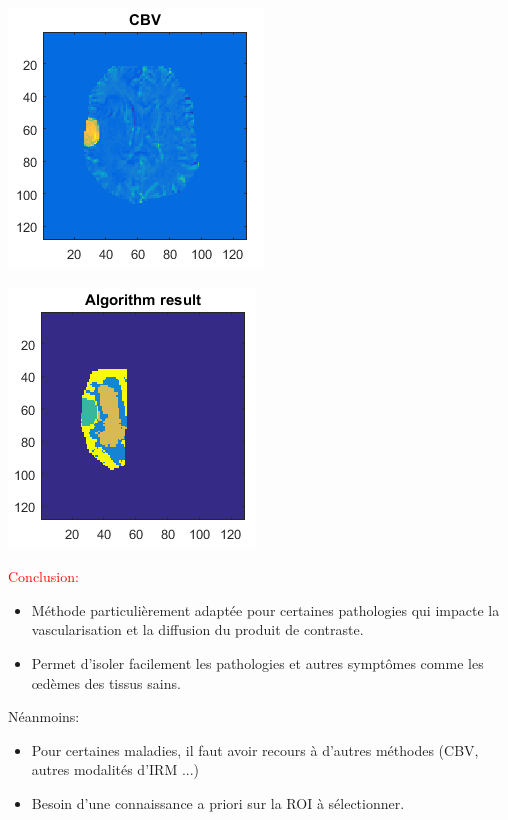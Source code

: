 \documentclass{beamer}
\begin{document}
\begin{frame}
\centering

\includegraphics[scale=0.8]{Patient4Result-CBV.png}

\end{frame}

\begin{frame}
\centering

\includegraphics[scale=0.8]{Patient4Result-ALGO.png}

\end{frame}


\begin{frame}

\textcolor{red}{Conclusion:}

\begin{itemize}
\item Méthode particulièrement adaptée pour certaines pathologies qui impacte la vascularisation et la diffusion du produit de contraste.
\item Permet d'isoler facilement les pathologies et autres symptômes comme les œdèmes des tissus sains.
\end{itemize}

Néanmoins:

\begin{itemize}
\item Pour certaines maladies, il faut avoir recours à d'autres méthodes (CBV, autres modalités d'IRM ...)
\item Besoin d'une connaissance a priori sur la ROI à sélectionner.
\end{itemize}


\end{frame}
\end{document}
